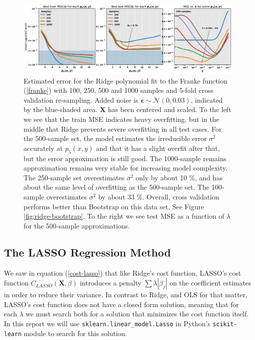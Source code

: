 \documentclass[]{article}
\begin{document}
\begin{figure}[!htb]
	\centering
	\includegraphics[width=1\linewidth]{./results/ridge-cv.png}
	\caption{Estimated error for the Ridge polynomial fit to the Franke function (\ref{franke}) with 100, 250, 500 and 1000 samples and 5-fold cross validation re-sampling. Added noise is $\mathbf{\epsilon} \sim \mathcal{N}(0, 0.03)$, indicated by the blue-shaded area. $\mathbf{X}$ has been centered and scaled. To the left we see that the train MSE indicates heavy overfitting, but in the middle that Ridge prevents severe overfitting in all test cases. For the 500-sample set, the model estimates the irreducible error $\sigma^2$ accurately at $p_5(x,y)$ and that it has a slight overfit after that, but the error approximation is still good. The 1000-sample remains approximation remains very stable for increasing model complexity. The 250-sample set overestimates $\sigma^2$ only by about 10 \%, and has about the same level of overfitting as the 500-sample set. The 100-sample overestimates $\sigma^2$ by about 33 \%. Overall, cross validation performs better than Bootstrap on this data set. See Figure \ref{fig:ridge-bootstrap}. To the right we see test MSE as a function of $\lambda$ for the 500-sample approximations.}
	\label{fig:ridge-cv}
\end{figure}

\subsection{The LASSO Regression Method}
We saw in equation (\ref{cost-lasso}) that like Ridge's cost function, LASSO's cost function $C_{LASSO}(\mathbf{X},\mathbb{\beta})$ introduces a penalty $\sum \lambda |\beta_j|$ on the coefficient estimates in order to reduce their variance. In contrast to Ridge, and OLS for that matter, LASSO's cost function does not have a closed form solution, meaning that for each $\lambda$ we must search both for a solution that minimizes the cost function itself. In this report we will use \lstinline|sklearn.linear_model.Lasso| in Python's \lstinline|scikit-learn| module to search for this solution.
\end{document}
